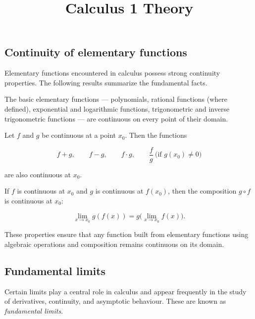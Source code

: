 \documentclass[11pt,a4paper]{article} \usepackage[T1]{fontenc}
\theoremstyle{plain} \newtheorem{theorem}{Theorem} \title{Calculus 1 Theory}
\begin{document}
\subsection{Continuity of elementary functions}

Elementary functions encountered in calculus possess strong continuity
properties. The following results summarize the fundamental facts.

\begin{definition}
 The basic elementary functions —
polynomials, rational functions (where defined), exponential and logarithmic
functions, trigonometric and inverse trigonometric functions — are continuous
on every point of their domain.
\end{definition}

\begin{definition}
 Let $f$ and $g$ be continuous at
a point $x_0$. Then the functions

\[
f+g,\qquad f-g,\qquad f\cdot g,\qquad \frac{f}{g}\ \text{(if } g(x_0)\ne 0)
\]

are also continuous at $x_0$.
\end{definition}

\begin{definition}
 If $f$ is continuous at $x_0$ and $g$ is
continuous at $f(x_0)$, then the composition $g\circ f$ is continuous at $x_0$:

\[
\lim_{x\to x_0} g(f(x)) = g\bigl(\lim_{x\to x_0} f(x)\bigr).
\]

\end{definition}

These properties ensure that any function built from elementary functions using
algebraic operations and composition remains continuous on its domain.

\subsection{Fundamental limits}

Certain limits play a central role in calculus and appear frequently in the
study of derivatives, continuity, and asymptotic behaviour. These are known as
\emph{fundamental limits}.
\end{document}
